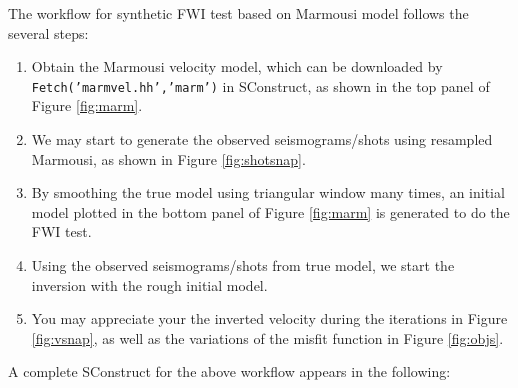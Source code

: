 The workflow for synthetic FWI test based on Marmousi model follows the several steps:
\begin{enumerate}
 \item Obtain the Marmousi velocity model, which can be downloaded by  \texttt{Fetch('marmvel.hh','marm')} in SConstruct, as shown in the top panel of Figure \ref{fig:marm}.
 
 \item We may start to generate the observed seismograms/shots using resampled Marmousi, as shown in Figure \ref{fig:shotsnap}.
 
 \item By smoothing the true model using triangular window many times, an initial model plotted in the bottom panel of Figure \ref{fig:marm} is generated to do the FWI test.
 
 \item Using the observed seismograms/shots from true model, we start the inversion with the rough initial model.
 
 \item  You may appreciate your the inverted velocity during the iterations in Figure \ref{fig:vsnap}, as well as the variations of the misfit function in Figure \ref{fig:objs}.
\end{enumerate}
A complete SConstruct for the above workflow appears in the following:






 

